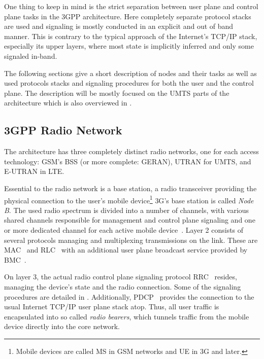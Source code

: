 One thing to keep in mind is the strict separation between user plane and control plane tasks in the \gls{3GPP} architecture. Here completely separate protocol stacks are used and signaling is mostly conducted in an explicit and out of band manner. This is contrary to the typical approach of the Internet's \gls{TCP}/\gls{IP} stack, especially its upper layers, where most state is implicitly inferred and only some signaled in-band. 

The following sections give a short description of nodes and their tasks as well as used protocols stacks and signaling procedures for both the user and the control plane. The description will be mostly focused on the \gls{UMTS} parts of the architecture which is also overviewed in \cite{3gpp.23.101}.


\subsection{\texorpdfstring{\acrshort{3GPP}}{3GPP} Radio Network}

The architecture has three completely distinct radio networks, one for each access technology: \gls{GSM}'s \gls{BSS} (or more complete: \gls{GERAN}), \gls{UTRAN} for \gls{UMTS}, and \gls{E-UTRAN} in \gls{LTE}.

Essential to the radio network is a base station, a radio transceiver providing the physical connection to the user's mobile device\footnote{Mobile devices are called \gls{MS} in \gls{GSM} networks and \gls{UE} in \gls{3G} and later.} \gls{3G}'s base station is called \textit{Node B}. The used radio spectrum is divided into a number of channels, with various shared channels responsible for management and control plane signaling and one or more dedicated channel for each active mobile device~\cite{3gpp.25.201,3gpp.25.301}. Layer 2 consists of several protocols managing and multiplexing transmissions on the link. These are \gls{MAC}~\cite{3gpp.25.321} and \gls{RLC}~\cite{3gpp.25.322} with an additional user plane broadcast service provided by \gls{BMC}~\cite{3gpp.25.324}. 

On layer 3, the actual radio control plane signaling protocol \gls{RRC}~\cite{3gpp.25.331} resides, managing the device's state and the radio connection. Some of the signaling procedures are detailed in \cite{3gpp.25.931}. Additionally, \gls{PDCP}~\cite{3gpp.25.323} provides the connection to the  usual Internet \gls{TCP}/\gls{IP} user plane stack atop. Thus, all user traffic is encapsulated into so called \textit{radio bearers}, which tunnels traffic from the mobile device directly into the core network.

